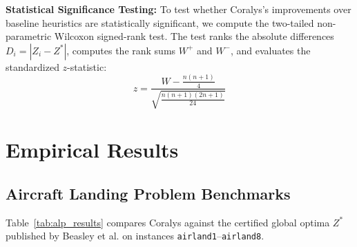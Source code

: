 \documentclass[10pt,journal,compsoc]{IEEEtran}
\begin{document}
\textbf{Statistical Significance Testing:} To test whether Coralys's improvements over baseline heuristics are statistically significant, we compute the two-tailed non-parametric Wilcoxon signed-rank test. The test ranks the absolute differences $D_i = |Z_i - Z^*|$, computes the rank sums $W^+$ and $W^-$, and evaluates the standardized $z$-statistic:
\begin{equation}
z = \frac{W - \frac{n(n+1)}{4}}{\sqrt{\frac{n(n+1)(2n+1)}{24}}}
\end{equation}

\section{Empirical Results}
\label{sec:results}

\subsection{Aircraft Landing Problem Benchmarks}
Table~\ref{tab:alp_results} compares Coralys against the certified global optima $Z^*$ published by Beasley et al. \cite{beasley2000scheduling} on instances \texttt{airland1}--\texttt{airland8}.
\end{document}
